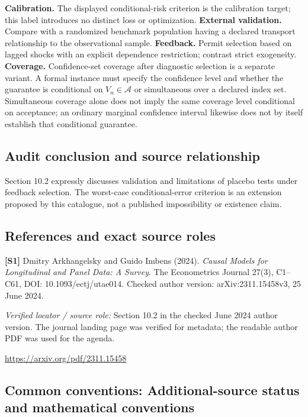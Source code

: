 \documentclass[11pt,a4paper]{article}
\begin{document}
\textbf{Calibration.} The displayed conditional-risk criterion is the calibration target; this label introduces no distinct loss or optimization. \textbf{External validation.} Compare with a randomized benchmark population having a declared transport relationship to the observational sample. \textbf{Feedback.} Permit selection based on lagged shocks with an explicit dependence restriction; contrast strict exogeneity. \textbf{Coverage.} Confidence-set coverage after diagnostic selection is a separate variant. A formal instance must specify the confidence level and whether the guarantee is conditional on $V_n\in\mathcal A$ or simultaneous over a declared index set. Simultaneous coverage alone does not imply the same coverage level conditional on acceptance; an ordinary marginal confidence interval likewise does not by itself establish that conditional guarantee.

\subsection*{Audit conclusion and source relationship}

Section 10.2 expressly discusses validation and limitations of placebo tests under feedback selection. The worst-case conditional-error criterion is an extension proposed by this catalogue, not a published impossibility or existence claim.

\subsection*{References and exact source roles}

{\footnotesize\raggedright
\par\noindent\textbf{[S1]} Dmitry Arkhangelsky and Guido Imbens (2024). \emph{Causal Models for Longitudinal and Panel Data: A Survey}. The Econometrics Journal 27(3), C1--C61, DOI: 10.1093/ectj/utae014. Checked author version: arXiv:2311.15458v3, 25 June 2024.\par \textit{Verified locator / source role:} Section 10.2 in the checked June 2024 author version. The journal landing page was verified for metadata; the readable author PDF was used for the agenda.\par \url{https://arxiv.org/pdf/2311.15458}\par\smallskip
}

\subsection*{Common conventions: Additional-source status and mathematical conventions}
\end{document}
